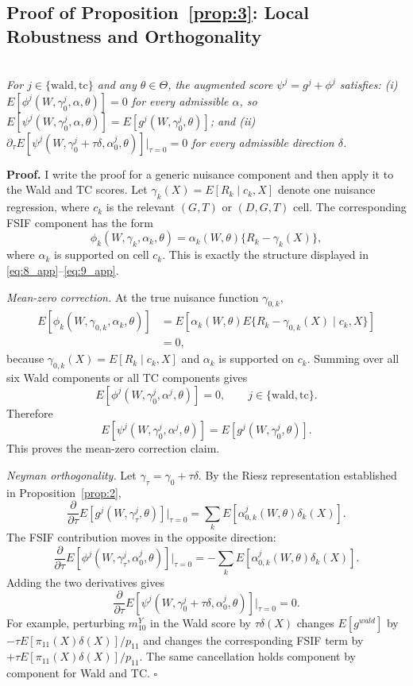 \begin{propproof}
\end{propproof}

\subsection{Proof of Proposition~\ref{prop:3}: Local Robustness and Orthogonality}\label{sec:app_proof_prop3}
\begin{propproof}

\noindent \\
\textit{For $j\in\{\text{wald},\text{tc}\}$ and any $\theta\in\Theta$, the augmented score $\psi^j=g^j+\phi^j$ satisfies: (i) $E[\phi^j(W,\gamma^j_0,\alpha,\theta)]=0$ for every admissible $\alpha$, so $E[\psi^j(W,\gamma^j_0,\alpha,\theta)]=E[g^j(W,\gamma^j_0,\theta)]$; and (ii) $\partial_\tau E[\psi^j(W,\gamma^j_0+\tau\delta,\alpha^j_0,\theta)]|_{\tau=0}=0$ for every admissible direction $\delta$.}

\medskip
\noindent\textbf{Proof.} I write the proof for a generic nuisance component and then apply it to the Wald and TC scores. Let $\gamma_k(X)=E[R_k\mid c_k,X]$ denote one nuisance regression, where $c_k$ is the relevant $(G,T)$ or $(D,G,T)$ cell. The corresponding FSIF component has the form
\[
    \phi_k(W,\gamma_k,\alpha_k,\theta)
    =
    \alpha_k(W,\theta)\{R_k-\gamma_k(X)\},
\]
where $\alpha_k$ is supported on cell $c_k$. This is exactly the structure displayed in \eqref{eq:8_app}--\eqref{eq:9_app}.

\medskip
\noindent\textit{Mean-zero correction.} At the true nuisance function $\gamma_{0,k}$,
\begin{align*}
    E[\phi_k(W,\gamma_{0,k},\alpha_k,\theta)]
    &=
    E\!\left[\alpha_k(W,\theta)
    E\{R_k-\gamma_{0,k}(X)\mid c_k,X\}\right] \\
    &=0,
\end{align*}
because $\gamma_{0,k}(X)=E[R_k\mid c_k,X]$ and $\alpha_k$ is supported on $c_k$. Summing over all six Wald components or all TC components gives
\[
    E[\phi^j(W,\gamma^j_0,\alpha^j,\theta)]=0,
    \qquad j\in\{\text{wald},\text{tc}\}.
\]
Therefore
\[
    E[\psi^j(W,\gamma^j_0,\alpha^j,\theta)]
    =
    E[g^j(W,\gamma^j_0,\theta)].
\]
This proves the mean-zero correction claim.

\medskip
\noindent\textit{Neyman orthogonality.} Let $\gamma_\tau=\gamma_0+\tau\delta$. By the Riesz representation established in Proposition~\ref{prop:2},
\[
    \frac{\partial}{\partial\tau}
    E[g^j(W,\gamma^j_\tau,\theta)]\bigg|_{\tau=0}
    =
    \sum_k E[\alpha^j_{0,k}(W,\theta)\delta_k(X)].
\]
The FSIF contribution moves in the opposite direction:
\[
    \frac{\partial}{\partial\tau}
    E[\phi^j(W,\gamma^j_\tau,\alpha^j_0,\theta)]\bigg|_{\tau=0}
    =
    -\sum_k E[\alpha^j_{0,k}(W,\theta)\delta_k(X)].
\]
Adding the two derivatives gives
\[
    \frac{\partial}{\partial\tau}
    E[\psi^j(W,\gamma^j_0+\tau\delta,\alpha^j_0,\theta)]
    \bigg|_{\tau=0}
    =0.
\]
For example, perturbing $m^Y_{10}$ in the Wald score by $\tau\delta(X)$ changes $E[g^{wald}]$ by $-\tau E[\pi_{11}(X)\delta(X)]/p_{11}$ and changes the corresponding FSIF term by $+\tau E[\pi_{11}(X)\delta(X)]/p_{11}$. The same cancellation holds component by component for Wald and TC. $\square$


\end{propproof}
